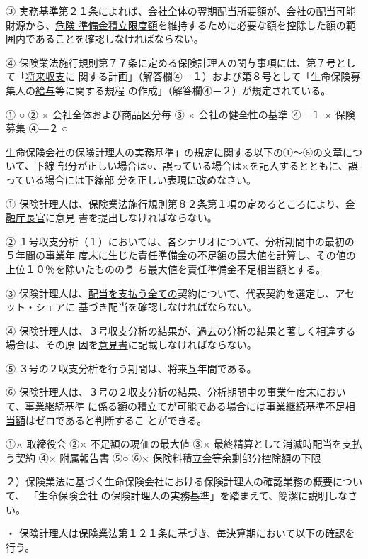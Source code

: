 \documentclass[report,gutter=10mm,fore-edge=10mm,uplatex,dvipdfmx]{jlreq}
\begin{document}
③ 実務基準第２１条によれば、会社全体の翌期配当所要額が、会社の配当可能財源から、\underline{危険
準備金積立限度額}を維持するために必要な額を控除した額の範囲内であることを確認しなければならない。

④ 保険業法施行規則第７７条に定める保険計理人の関与事項には、第７号として「\underline{将来収支}に
関する計画」（解答欄④－１）および第８号として「生命保険募集人の\underline{給与}等に関する規程
の作成」（解答欄④－２）が規定されている。


\answer{}
① ○ 
② × 会社全体および商品区分毎 
③ × 会社の健全性の基準 
④―１ × 保険募集 
④―２ ○ 

生命保険会社の保険計理人の実務基準」の規定に関する以下の①～⑥の文章について、下線
部分が正しい場合は○、誤っている場合は×を記入するとともに、誤っている場合には下線部
分を正しい表現に改めなさい。

① 保険計理人は、保険業法施行規則第８２条第１項の定めるところにより、\underline{金融庁長官}に意見
書を提出しなければならない。

② １号収支分析（１）においては、各シナリオについて、分析期間中の最初の５年間の事業年
度末に生じた責任準備金の\underline{不足額の最大値}を計算し、その値の上位１０％を除いたもののう
ち最大値を責任準備金不足相当額とする。

③ 保険計理人は、\underline{配当を支払う全ての}契約について、代表契約を選定し、アセット・シェアに
基づき配当を確認しなければならない。

④ 保険計理人は、３号収支分析の結果が、過去の分析の結果と著しく相違する場合は、その原
因を\underline{意見書}に記載しなければならない。

⑤ ３号の２収支分析を行う期間は、将来\underline{５}年間である。

⑥ 保険計理人は、３号の２収支分析の結果、分析期間中の事業年度末において、事業継続基準
に係る額の積立てが可能である場合には\underline{事業継続基準不足相当額}はゼロであると判断するこ
とができる。

\answer{}

①× 取締役会 
②× 不足額の現価の最大値 
③× 最終精算として消滅時配当を支払う契約 
④× 附属報告書 
⑤○
⑥× 保険料積立金等余剰部分控除額の下限  

２）保険業法に基づく生命保険会社における保険計理人の確認業務の概要について、
「生命保険会社
の保険計理人の実務基準」を踏まえて、簡潔に説明しなさい。

\answer{}

・ 保険計理人は保険業法第１２１条に基づき、毎決算期において以下の確認を行う。
\end{document}
